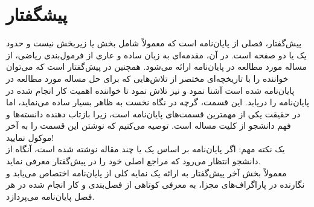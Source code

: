 \chapter*{پیشگفتار }

پیش‌گفتار، فصلی از پایان‌نامه است که معمولاً شامل بخش یا زیربخش نیست و حدود یک یا دو صفحه است. در آن، مقدمه‌ای به زبان ساده و عاری از فرمول‌بندی ریاضی، از مساله مورد مطالعه در پایان‌نامه ارائه می‌شود. همچنین در پیش‌گفتار است که می‌توان خواننده را با تاریخچه‌ای مختصر از تلاش‌هایی که برای حل مساله مورد مطالعه در پایان‌نامه شده است آشنا نمود و نیز تلاش نمود تا خواننده اهمیت کار انجام شده در پایان‌نامه را دریابد. این قسمت، گرچه در نگاه نخست به ظاهر بسیار ساده می‌نماید، اما در حقیقت یکی از  مهمترین قسمت‌های پایان‌نامه است، زیرا بازتاب دهنده دانسته‌ها و فهم دانشجو از کلیت مساله است. توصیه می‌کنیم که نوشتن این قسمت را به آخر موکول نمایید!
\\
یک نکته مهم: اگر پایان‌نامه بر اساس یک یا چند مقاله نوشته شده است، آنگاه از دانشجو انتظار می‌رود که مراجع اصلی خود را در پیش‌گفتار معرفی نماید.
\\
معمولاً بخش آخر پیش‌گفتار به ارائه یک نمایه کلی از پایان‌نامه اختصاص می‌یابد و نگارنده در پاراگراف‌های مجزا، به معرفی کوتاهی از فصل‌بندی و کار انجام شده در هر فصل پایان‌نامه می‌پردازد.

 

